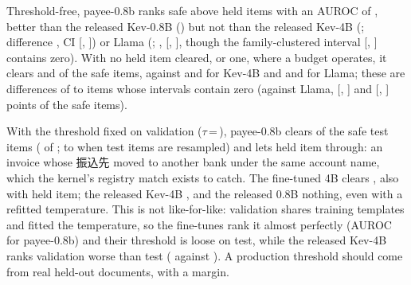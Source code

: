 \documentclass[conference]{IEEEtran}
\begin{document}
Threshold-free, payee-0.8b ranks safe above held items with an AUROC of \NOursAuroc{},
better than the released Kev-0.8B (\NBaseAuroc{}) but not than the released Kev-4B (\NBaseFourAuroc{}; difference
\NVsBaseFourAurocDelta{}, CI [\NVsBaseFourAurocLo, \NVsBaseFourAurocHi]) or Llama (\NLlamaAuroc{};
\NVsLlamaAurocDelta{}, [\NVsLlamaAurocLo, \NVsLlamaAurocHi], though the family-clustered interval [\NVsLlamaAurocFamLo,
\NVsLlamaAurocFamHi] contains zero). With no held item cleared, or one, where a \NBudget{} budget operates, it clears
\NOursClearZero{} and \NOursClearOne{} of the \NSafeTest{} safe items, against \NBaseFourClearZero{} and
\NBaseFourClearOne{} for Kev-4B and \NLlamaClearZero{} and \NLlamaClearOne{} for Llama; these are differences of
\NClearGapMin{} to \NClearGapMax{} items whose intervals contain zero (against Llama, [\NVsLlamaClearZeroLo, \NVsLlamaClearZeroHi] and
[\NVsLlamaClearOneLo, \NVsLlamaClearOneHi] points of the safe items). \NFrontierRouting{}

With the threshold fixed on validation ($\tau$\,=\,\NOursThreshold), payee-0.8b clears \NOursDeployed{} of the safe test
items (\NOursDeployedN{} of \NSafeTest{}; \NOursDeployedLo{} to \NOursDeployedHi{} when test items are resampled) and
lets \NOursFalseClears{} held item through: an invoice whose 振込先 moved to another bank under the same account name,
which the kernel's registry match exists to catch. The fine-tuned 4B clears \NOursFourDeployed{}, also with
\NOursFourFalseClears{} held item; the released Kev-4B \NBaseFourDeployed{}, and the released 0.8B nothing, even with a
refitted temperature. This is not like-for-like: validation shares training templates and fitted the temperature, so
the fine-tunes rank it almost perfectly (AUROC \NOursAurocVal{} for payee-0.8b) and their threshold is loose on test,
while the released Kev-4B ranks validation worse than test (\NBaseFourAurocVal{} against \NBaseFourAuroc{}). A
production threshold should come from real held-out documents, with a margin.
\end{document}

